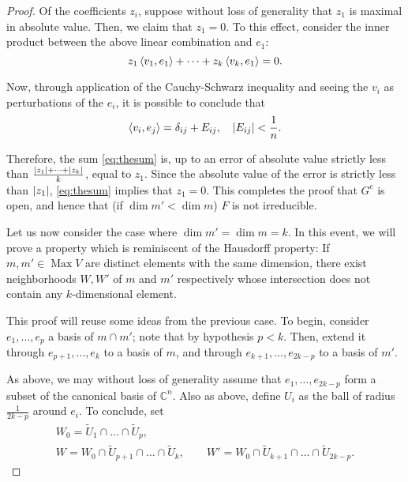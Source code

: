 \documentclass{article}
\theoremstyle{plain}
\theoremstyle{nonumberplain}
\newtheorem{proof}{Proof}
\DeclareMathOperator{\Max}{Max}
\DeclarePairedDelimiter{\abs}{\lvert}{\rvert}
\newcommand{\C}{\mathbb{C}}
\begin{document}
\begin{proof}
Of the coefficients $z_i$, suppose without loss of generality that $z_1$ is maximal in absolute value. Then, we claim that $z_1 = 0$. To this effect, consider the inner product between the above linear combination and $e_1$:
\begin{equation}\label{eq:thesum}
z_1 \braket{v_1,e_1} + \dots + z_k \braket{v_k, e_1} = 0.
\end{equation}

Now, through application of the Cauchy-Schwarz inequality and seeing the $v_i$ as perturbations of the $e_i$, it is possible to conclude that
\begin{equation}
\braket{v_i, e_j} = \delta_{ij} + E_{ij}, \quad \abs{E_{ij}} < \frac1n.
\end{equation}

Therefore, the sum \eqref{eq:thesum} is, up to an error of absolute value strictly less than $\frac{\abs{z_1} + \dots + \abs{z_k}}k$, equal to $z_1$. Since the absolute value of the error is strictly less than $\abs{z_1}$, \eqref{eq:thesum} implies that $z_1 = 0$.  This completes the proof that $G^c$ is open, and hence that (if $\dim m' < \dim m$) $F$ is not irreducible.

\medskip

Let us now consider the case where $\dim m' = \dim m = k$. In this event, we will prove a property which is reminiscent of the Hausdorff property: If $m, m' \in \Max V$ are distinct elements with the same dimension, there exist neighborhoods $W, W'$ of $m$ and $m'$ respectively whose intersection does not contain any $k$-dimensional element.

This proof will reuse some ideas from the previous case. To begin, consider $e_1, \dots, e_p$ a basis of $m \cap m'$; note that by hypothesis $p < k$. Then, extend it through $e_{p+1}, \dots, e_k$ to a basis of $m$, and through $e_{k+1}, \dots, e_{2k-p}$ to a basis of $m'$.

As above, we may without loss of generality assume that $e_1, \dots, e_{2k-p}$ form a subset of the canonical basis of $\C^n$. Also as above, define $U_i$ as the ball of radius $\frac1{2k-p}$ around $e_i$. To conclude, set
\begin{equation}
\begin{gathered}
W_0 = \tilde U_1 \cap \dots \cap \tilde U_p,\\
W = W_0 \cap \tilde U_{p+1} \cap \dots \cap \tilde U_k, \qquad W' = W_0 \cap \tilde U_{k+1} \cap \dots \cap \tilde U_{2k-p}.
\end{gathered}
\end{equation}


\end{proof}
\end{document}
